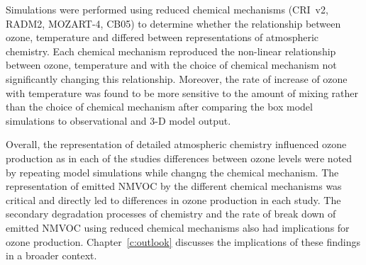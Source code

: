 Simulations were performed using reduced chemical mechanisms (CRI~v2, RADM2, MOZART-4, CB05) to determine whether the relationship between ozone, temperature and  differed between representations of atmospheric chemistry.
Each chemical mechanism reproduced the non-linear relationship between ozone, temperature and  with the choice of chemical mechanism not significantly changing this relationship.
Moreover, the rate of increase of ozone with temperature was found to be more sensitive to the amount of mixing rather than the choice of chemical mechanism after comparing the box model simulations to observational and 3-D model output.

Overall, the representation of detailed atmospheric chemistry influenced ozone production as in each of the studies differences between ozone levels were noted by repeating model simulations while changng the chemical mechanism.
The representation of emitted NMVOC by the different chemical mechanisms was critical and directly led to differences in ozone production in each study.
The secondary degradation processes of  chemistry and the rate of break down of emitted NMVOC using reduced chemical mechanisms also had implications for ozone production.
Chapter~\ref{c:outlook} discusses the implications of these findings in a broader context.

